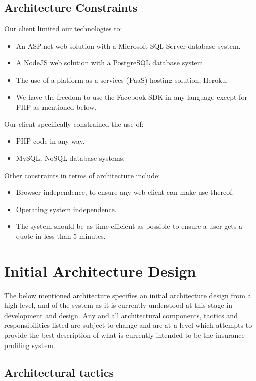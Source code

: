 \documentclass{article}
\begin{document}
	\subsection{Architecture Constraints}
	Our client limited our technologies to:
	\begin{itemize}
		\item An ASP.net web solution with a Microsoft SQL Server database system.
		\item A NodeJS web solution with a PostgreSQL database system.
		\item The use of a platform as a services (PaaS) hosting solution, Heroku.
		\item We have the freedom to use the Facebook SDK in any language except for PHP as mentioned below.
	\end{itemize}
	Our client specifically constrained the use of:
		\begin{itemize}
		\item PHP code in any way.
		\item MySQL, NoSQL database systems.
		\end{itemize}	
	Other constraints in terms of architecture include:
	\begin{itemize}
		\item Browser independence, to ensure any web-client can make use thereof.
		\item Operating system independence.
		\item The system should be as time efficient as possible to ensure a user gets a quote in less than 5 minutes.
		\end{itemize}
	
	
	\section{Initial Architecture Design}

	The below mentioned architecture specifies an initial architecture design from a high-level, and of the system as it is currently understood at this stage in development and design. Any and all architectural components, tactics and responsibilities listed are subject to change and are at a level which attempts to provide the best description of what is currently intended to be the insurance profiling system. 

	\subsection{Architectural tactics}
\end{document}
